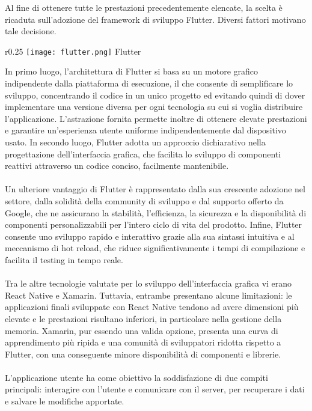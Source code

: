 Al fine di ottenere tutte le prestazioni precedentemente elencate,
la scelta è ricaduta sull'adozione del framework di sviluppo Flutter.
Diversi fattori motivano tale decisione. \\
\begin{wrapfigure}{r}{0.25\textwidth}
    \centering
    \texttt{[image: flutter.png]}
    Flutter
\end{wrapfigure}
In primo luogo, l'architettura di Flutter si basa su un motore grafico
indipendente dalla piattaforma di esecuzione,
il che consente di semplificare lo sviluppo,
concentrando il codice in un unico progetto ed
evitando quindi di dover implementare una versione diversa
per ogni tecnologia su cui si voglia distribuire l'applicazione.
L'astrazione fornita permette inoltre di ottenere elevate prestazioni e
garantire un'esperienza utente uniforme indipendentemente dal dispositivo usato.
In secondo luogo, Flutter adotta un approccio dichiarativo 
nella progettazione dell'interfaccia grafica,
che facilita lo sviluppo di componenti reattivi attraverso un codice conciso, 
facilmente mantenibile.\\
\\
Un ulteriore vantaggio di Flutter è rappresentato dalla sua crescente adozione nel settore,
dalla solidità della community di sviluppo e dal supporto offerto da Google,
che ne assicurano la stabilità, l'efficienza, la sicurezza e la disponibilità
di componenti personalizzabili per l'intero ciclo di vita del prodotto.
Infine, Flutter consente uno sviluppo rapido e interattivo
grazie alla sua sintassi intuitiva e al meccanismo di hot reload,
che riduce significativamente i tempi di compilazione e facilita il testing in tempo reale.\\
\\
Tra le altre tecnologie valutate per lo sviluppo dell'interfaccia grafica vi erano React Native e Xamarin.
Tuttavia, entrambe presentano alcune limitazioni:
le applicazioni finali sviluppate con React Native tendono ad avere dimensioni più elevate e
le prestazioni risultano inferiori,
in particolare nella gestione della memoria.
Xamarin, pur essendo una valida opzione, presenta una curva di apprendimento più ripida e
una comunità di sviluppatori ridotta rispetto a Flutter,
con una conseguente minore disponibilità di componenti e librerie.\\
\\
L'applicazione utente ha come obiettivo la soddisfazione di due compiti principali:
interagire con l'utente e comunicare con il server,
per recuperare i dati e salvare le modifiche apportate.

